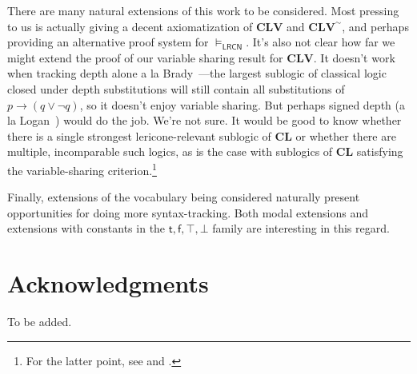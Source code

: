 \documentclass{amsart}
\theoremstyle{definition}
\newcommand{\LRCN}{\mathsf{LRCN}}
\newcommand{\CLV}{\mathbf{CLV}}
\newcommand{\logic}[1]{{\ensuremath {\mathbf{#1}}}}
\begin{document}
There are many natural extensions of this work to be considered. Most pressing to us is actually giving a decent axiomatization of $\CLV$ and $\CLV^{\sim}$, and perhaps providing an alternative proof system for $\models_\LRCN$. It's also not clear how far we might extend the proof of our variable sharing result for $\CLV$. It doesn't work when tracking depth alone a la Brady~\citeyearpar{brady1984}---the largest sublogic of classical logic closed under depth substitutions will still contain all substitutions of $p\to(q\lor\neg q)$, so it doesn't enjoy variable sharing. But perhaps signed depth (a la Logan~\citeyearpar{logan2021}) would do the job. We're not sure. It would be good to know whether there is a single strongest lericone-relevant sublogic of \logic{CL} or whether there are multiple, incomparable such logics, as is the case with sublogics of \logic{CL} satisfying the variable-sharing criterion.\footnote{For the latter point, see \citet{Swirydowicz1999-SWITEE} and \citet{Mendez2012-MNDTEP}.
}

Finally, extensions of the vocabulary being considered naturally present opportunities for doing more syntax-tracking. Both modal extensions and extensions with constants in the $\mathsf{t},\mathsf{f},\top,\bot$ family are interesting in this regard.

\section*{Acknowledgments}
To be added. 




\end{document}
